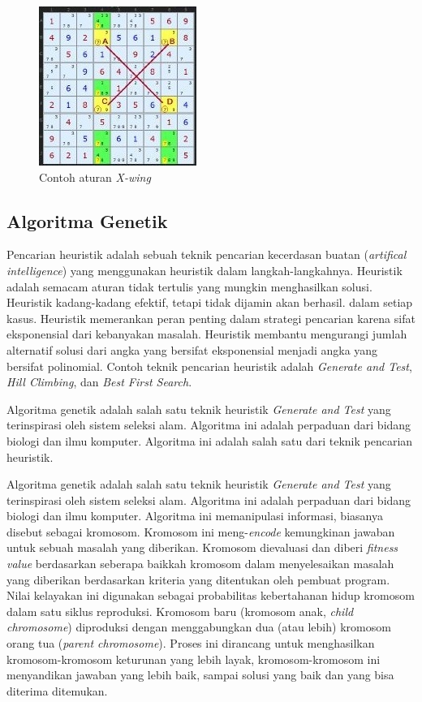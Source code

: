 \begin{figure}
\centering
\captionsetup{justification=centering}
\includegraphics[scale=1]{Gambar/HybridGenetic6}
\caption[Contoh aturan  \textit{X-wing}  ~\cite{johanna:12:hybrid}]{Contoh aturan  \textit{X-wing} ~\cite{johanna:12:hybrid}}
\label{fig:hybrid6}
\end{figure}

\subsection{Algoritma Genetik}
\label{sec:genetik}

Pencarian heuristik adalah sebuah teknik pencarian kecerdasan buatan (\textit{artifical intelligence}) yang menggunakan heuristik dalam langkah-langkahnya. Heuristik adalah semacam aturan tidak tertulis yang mungkin menghasilkan solusi. Heuristik kadang-kadang efektif, tetapi tidak dijamin akan berhasil. dalam setiap kasus. Heuristik memerankan peran penting dalam strategi pencarian karena sifat eksponensial dari kebanyakan masalah. Heuristik membantu mengurangi jumlah alternatif solusi dari angka yang bersifat eksponensial menjadi angka yang bersifat polinomial. Contoh teknik pencarian heuristik adalah \textit{Generate and Test}, \textit{Hill Climbing}, dan \textit{Best First Search}.

Algoritma genetik adalah salah satu teknik heuristik \textit{Generate and Test} yang terinspirasi oleh sistem seleksi alam. Algoritma ini adalah perpaduan dari bidang biologi dan ilmu komputer. Algoritma ini adalah salah satu dari teknik pencarian heuristik. 

Algoritma genetik adalah salah satu teknik heuristik \textit{Generate and Test} yang terinspirasi oleh sistem seleksi alam. Algoritma ini adalah perpaduan dari bidang biologi dan ilmu komputer. Algoritma ini memanipulasi informasi, biasanya disebut sebagai kromosom. Kromosom ini meng-\textit{encode} kemungkinan jawaban untuk sebuah masalah yang diberikan. Kromosom dievaluasi dan diberi \textit{fitness value} berdasarkan seberapa baikkah kromosom dalam menyelesaikan masalah yang diberikan berdasarkan kriteria yang ditentukan oleh pembuat program. Nilai kelayakan ini digunakan sebagai probabilitas kebertahanan hidup kromosom dalam satu siklus reproduksi. Kromosom baru (kromosom anak, \textit{child chromosome}) diproduksi dengan menggabungkan dua (atau lebih) kromosom orang tua (\textit{parent chromosome}). Proses ini dirancang untuk menghasilkan kromosom-kromosom keturunan yang lebih layak, kromosom-kromosom ini menyandikan jawaban yang lebih baik, sampai solusi yang baik dan yang bisa diterima ditemukan.

